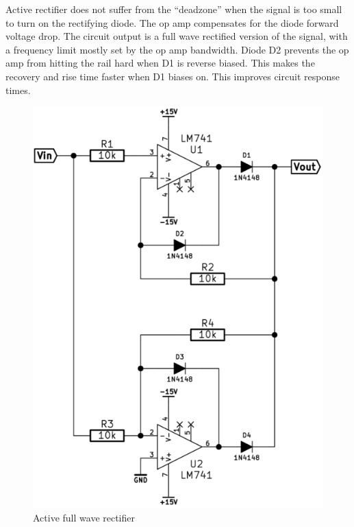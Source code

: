 \documentclass[]{article}
\begin{document}
Active rectifier does not suffer from the ``deadzone'' when the signal
is too small to turn on the rectifying diode. The op amp compensates for
the diode forward voltage drop. The circuit output is a full wave
rectified version of the signal, with a frequency limit mostly set by
the op amp bandwidth. Diode D2 prevents the op amp from hitting the rail
hard when D1 is reverse biased. This makes the recovery and rise time
faster when D1 biases on. This improves circuit response times.

\begin{figure}[htbp]
\centering
\includegraphics{img/fwr.png}
\caption{Active full wave rectifier}
\end{figure}
\end{document}
